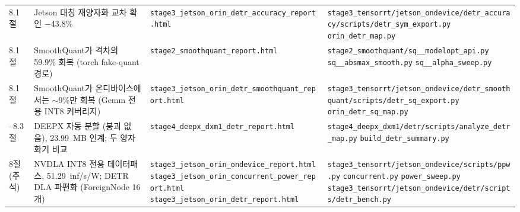 \documentclass[11pt]{article}
\begin{document}
\begin{longtable}{L{1.2cm} L{3.9cm} L{4.3cm} L{5.0cm}}
\addlinespace[2pt]
8.1절 & Jetson 대칭 재양자화 교차 확인 $-$43.8\% & \texttt{stage3\_\allowbreak jetson\_\allowbreak orin\_\allowbreak detr\_\allowbreak accuracy\_\allowbreak report.html} & \texttt{stage3\_\allowbreak tensorrt/\allowbreak jetson\_\allowbreak ondevice/\allowbreak detr\_\allowbreak accuracy/\allowbreak scripts/\allowbreak detr\_\allowbreak sym\_\allowbreak export.py} \newline \texttt{orin\_\allowbreak detr\_\allowbreak map.py} \\
\addlinespace[2pt]
8.1절 & SmoothQuant가 격차의 59.9\% 회복 (torch fake-quant 경로) & \texttt{stage2\_\allowbreak smoothquant\_\allowbreak report.html} & \texttt{stage2\_\allowbreak smoothquant/\allowbreak sq\_\_\allowbreak modelopt\_\allowbreak api.py} \newline \texttt{sq\_\_\allowbreak absmax\_\allowbreak smooth.py} \newline \texttt{sq\_\_\allowbreak alpha\_\allowbreak sweep.py} \\
\addlinespace[2pt]
8.1절 & SmoothQuant가 온디바이스에서는 ${\sim}$9\%만 회복 (Gemm 전용 INT8 커버리지) & \texttt{stage3\_\allowbreak jetson\_\allowbreak orin\_\allowbreak detr\_\allowbreak smoothquant\_\allowbreak report.html} & \texttt{stage3\_\allowbreak tensorrt/\allowbreak jetson\_\allowbreak ondevice/\allowbreak detr\_\allowbreak smoothquant/\allowbreak scripts/\allowbreak detr\_\allowbreak sq\_\allowbreak export.py} \newline \texttt{orin\_\allowbreak detr\_\allowbreak sq\_\allowbreak map.py} \\
--8.3절 & DEEPX 자동 분할 (붕괴 없음), 23.99~MB 인계; 두 양자화기 비교 & \texttt{stage4\_\allowbreak deepx\_\allowbreak dxm1\_\allowbreak detr\_\allowbreak report.html} & \texttt{stage4\_\allowbreak deepx\_\allowbreak dxm1/\allowbreak detr/\allowbreak scripts/\allowbreak analyze\_\allowbreak detr\_\allowbreak map.py} \newline \texttt{build\_\allowbreak detr\_\allowbreak summary.py} \\
\addlinespace[2pt]
8절 (주석) & NVDLA INT8 전용 데이터패스, 51.29~inf/s/W; DETR DLA 파편화 (ForeignNode 16개) & \texttt{stage3\_\allowbreak jetson\_\allowbreak orin\_\allowbreak ondevice\_\allowbreak report.html} \newline \texttt{stage3\_\allowbreak jetson\_\allowbreak orin\_\allowbreak concurrent\_\allowbreak power\_\allowbreak report.html} \newline \texttt{stage3\_\allowbreak jetson\_\allowbreak orin\_\allowbreak detr\_\allowbreak report.html} & \texttt{stage3\_\allowbreak tensorrt/\allowbreak jetson\_\allowbreak ondevice/\allowbreak scripts/\allowbreak ppw.py} \newline \texttt{concurrent.py} \newline \texttt{power\_\allowbreak sweep.py} \newline \texttt{stage3\_\allowbreak tensorrt/\allowbreak jetson\_\allowbreak ondevice/\allowbreak detr/\allowbreak scripts/\allowbreak detr\_\allowbreak bench.py} \\

\end{longtable}
\end{document}
